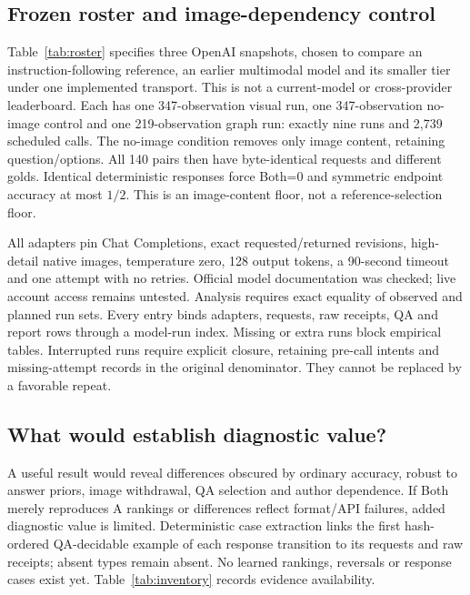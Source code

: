 \documentclass[10pt,twocolumn,letterpaper]{article}
\begin{document}
\subsection{Frozen roster and image-dependency control}
Table~\ref{tab:roster} specifies three OpenAI snapshots, chosen to compare
an instruction-following reference, an earlier multimodal model and its
smaller tier under one implemented transport. This is not a current-model
or cross-provider leaderboard. Each has one 347-observation visual run,
one 347-observation no-image control and one 219-observation graph run:
exactly nine runs and 2,739 scheduled calls. The no-image condition
removes only image content, retaining question/options. All 140 pairs then
have byte-identical requests and different golds. Identical deterministic
responses force Both=0 and symmetric endpoint accuracy at most $1/2$.
This is an image-content floor, not a reference-selection floor.

All adapters pin Chat Completions, exact requested/returned revisions,
high-detail native images, temperature zero, 128 output tokens,
a 90-second timeout and one attempt with no retries. Official model
documentation was checked; live account access remains untested.
Analysis requires exact equality of observed and planned run sets.
Every entry binds adapters, requests, raw receipts, QA and report rows
through a model-run index. Missing or extra runs block empirical tables.
Interrupted runs require explicit closure, retaining pre-call intents
and missing-attempt records in the original denominator. They cannot
be replaced by a favorable repeat.

\begin{table}[t]
\centering\small
\caption{Frozen complete roster. OpenAI is the provider for every row.
Runs means completed/planned; each plan includes visual, no-image and
text-graph conditions. No collection dates or scores exist yet.
The complete inclusion and failure policies are frozen in the roster.}
\label{tab:roster}
\setlength{\tabcolsep}{3pt}

\end{table}

\subsection{What would establish diagnostic value?}
A useful result would reveal differences obscured by ordinary accuracy,
robust to answer priors, image withdrawal, QA selection and author
dependence. If Both merely reproduces A rankings or differences reflect
format/API failures, added diagnostic value is limited. Deterministic
case extraction links the first hash-ordered QA-decidable example of each
response transition to its requests and raw receipts; absent types
remain absent. No learned rankings, reversals or response cases exist
yet. Table~\ref{tab:inventory} records evidence availability.
\end{document}
